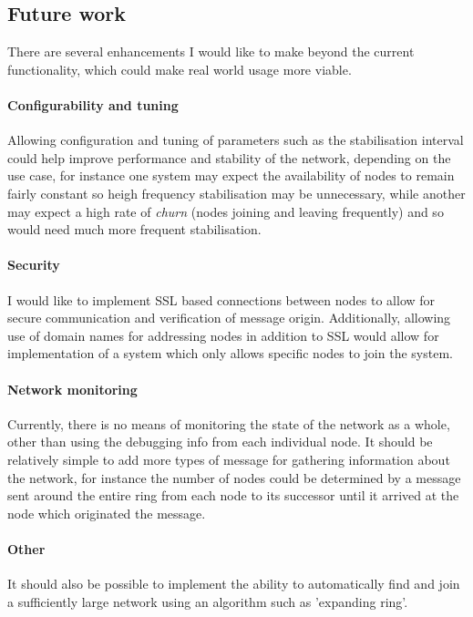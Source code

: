 \documentclass{article}
\begin{document}

\subsection{Future work}

There are several enhancements I would like to make beyond the current functionality, which could make real world usage more viable.
\paragraph{Configurability and tuning} Allowing configuration and tuning of parameters such as the stabilisation interval could help improve performance and stability of the network, depending on the use case, for instance one system may expect the availability of nodes to remain fairly constant so heigh frequency stabilisation may be unnecessary, while another may expect a high rate of \textit{churn} (nodes joining and leaving frequently) and so would need much more frequent stabilisation.

\paragraph{Security} I would like to implement SSL based connections between nodes to allow for secure communication and verification of message origin.
Additionally, allowing use of domain names for addressing nodes in addition to SSL would allow for implementation of a system which only allows specific nodes to join the system.

\paragraph{Network monitoring} Currently, there is no means of monitoring the state of the network as a whole, other than using the debugging info from each individual node. It should be relatively simple to add more types of message for gathering information about the network, for instance the number of nodes could be determined by a message sent around the entire ring from each node to its successor until it arrived at the node which originated the message.


\paragraph{Other} It should also be possible to implement the ability to automatically find and join a sufficiently large network using an algorithm such as 'expanding ring'.
\end{document}
